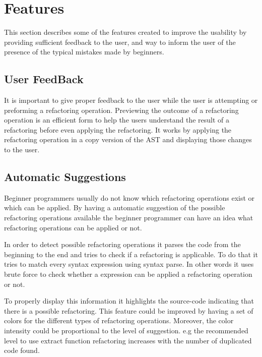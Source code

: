 \section{Features}
This section describes some of the features created to improve the usability by providing
sufficient feedback to the user, and way to inform the user of the presence
of the typical mistakes made by beginners.
\subsection{User FeedBack}
It is important to give proper feedback to the user while the user is attempting or
preforming a refactoring operation.
Previewing the outcome of a refactoring operation is an efficient form to
help the users understand the result of a refactoring before even applying the refactoring. %
It works by applying the refactoring operation in a copy version of the AST
and displaying those changes to the user.

\subsection{Automatic Suggestions}
Beginner programmers usually do not know which refactoring operations exist or
which can be applied.
By having a automatic suggestion of the possible refactoring operations available
 the beginner programmer can have an idea what refactoring operations can be
 applied or not.

In order to detect possible refactoring operations it parses the code from the
beginning to the end and tries to check if a refactoring is applicable.
To do that it tries to match every syntax expression using syntax parse.
In other words it uses brute force to check whether a expression can be applied
a refactoring operation or not.

To properly display this information it highlights the source-code indicating
that there is a possible refactoring.
This feature could be improved by having a set of colors for the different types
of refactoring operations.
Moreover, the color intensity could be proportional to the level
of suggestion. e.g the recommended level to use extract function refactoring
increases with the number of duplicated code found.


